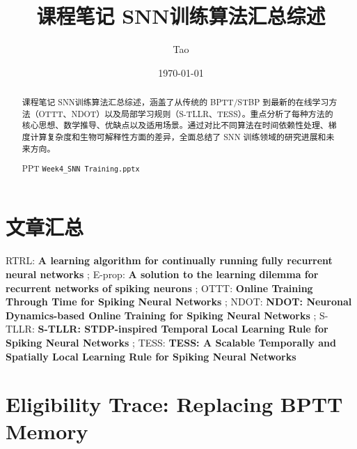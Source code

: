 \documentclass[journal,12pt,onecolumn]{IEEEtran}
\begin{document}
\title{课程笔记 SNN训练算法汇总综述}
\author{Tao}
\date{\today}
\maketitle

\begin{abstract}
课程笔记 SNN训练算法汇总综述，涵盖了从传统的 BPTT/STBP 到最新的在线学习方法（OTTT、NDOT）以及局部学习规则（S-TLLR、TESS）。重点分析了每种方法的核心思想、数学推导、优缺点以及适用场景。通过对比不同算法在时间依赖性处理、梯度计算复杂度和生物可解释性方面的差异，全面总结了 SNN 训练领域的研究进展和未来方向。


PPT \texttt{Week4\_SNN Training.pptx}
\end{abstract}

\section*{文章汇总}
RTRL: \textbf{A learning algorithm for continually running fully recurrent neural networks} \cite{williams1989learning};
E-prop: \textbf{A solution to the learning dilemma for recurrent networks of spiking neurons} \cite{bellec_solution_2020};
OTTT: \textbf{Online Training Through Time for Spiking Neural Networks} \cite{xiao_online_2022};
NDOT: \textbf{NDOT: Neuronal Dynamics-based Online Training for Spiking Neural Networks} \cite{jiang_ndot_nodate};
S-TLLR: \textbf{S-TLLR: STDP-inspired Temporal Local Learning Rule for Spiking Neural Networks} \cite{apolinario_s-tllr_2024};
TESS: \textbf{TESS: A Scalable Temporally and Spatially Local Learning Rule for Spiking Neural Networks} \cite{apolinario_tess_2025}

\section{Eligibility Trace: Replacing BPTT Memory}
\end{document}

